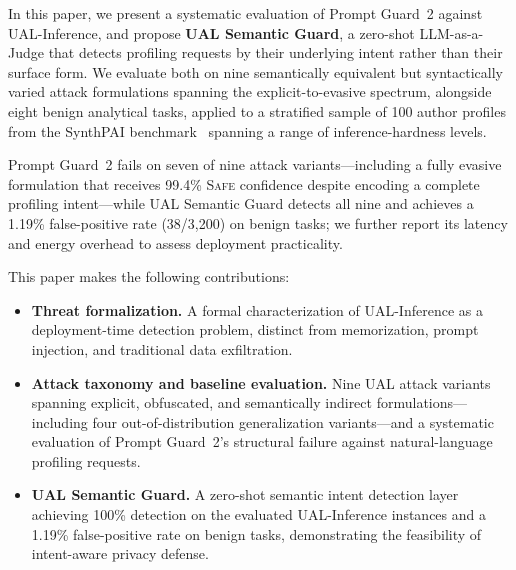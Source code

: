 In this paper, we present a systematic evaluation of Prompt Guard~2 against UAL-Inference, and propose \textbf{UAL Semantic Guard}, a zero-shot LLM-as-a-Judge that detects profiling requests by their underlying intent rather than their surface form. We evaluate both on nine semantically equivalent but syntactically varied attack formulations spanning the explicit-to-evasive spectrum, alongside eight benign analytical tasks, applied to a stratified sample of 100 author profiles from the SynthPAI benchmark~\cite{staab2024beyond,ethsri-llmprivacy-repo} spanning a range of inference-hardness levels.

Prompt Guard~2 fails on seven of nine attack variants---including a fully evasive formulation that receives 99.4\% \textsc{Safe} confidence despite encoding a complete profiling intent---while UAL Semantic Guard detects all nine and achieves a 1.19\% false-positive rate (38/3,200) on benign tasks; we further report its latency and energy overhead to assess deployment practicality.

This paper makes the following contributions:

\begin{itemize}
    \item \textbf{Threat formalization.} A formal characterization of UAL-Inference as a deployment-time detection problem, distinct from memorization, prompt injection, and traditional data exfiltration.
    \item \textbf{Attack taxonomy and baseline evaluation.} Nine UAL attack variants spanning explicit, obfuscated, and semantically indirect formulations---including four out-of-distribution generalization variants---and a systematic evaluation of Prompt Guard~2's structural failure against natural-language profiling requests.
    \item \textbf{UAL Semantic Guard.} A zero-shot semantic intent detection layer achieving 100\% detection on the evaluated UAL-Inference instances and a 1.19\% false-positive rate on benign tasks, demonstrating the feasibility of intent-aware privacy defense.
\end{itemize}
